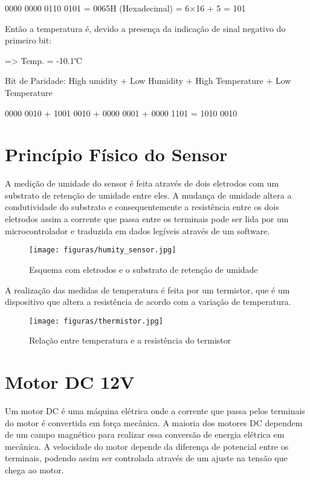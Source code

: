 0000 0000 0110 0101 = 0065H (Hexadecimal) = 6×16 + 5  = 101  

Então a temperatura é, devido a presença da indicação de sinal negativo do primeiro bit:

=> Temp. = -10.1℃ 

Bit de Paridade: High umidity + Low Humidity + High Temperature + Low Temperature

0000 0010 + 1001 0010 + 0000 0001 + 0000 1101 = 1010 0010

\section{Princípio Físico do Sensor}

A medição de umidade do sensor é feita através de dois eletrodos com um substrato de retenção de umidade entre eles. A mudança de umidade altera a condutividade do substrato e consequentemente a resistência entre os dois eletrodos assim a corrente que passa entre os terminais pode ser lida por um microcontrolador e traduzida em dados legíveis através de um software\cite{ned2017}.

\begin{figure}[H]
	\centering
	\texttt{[image: figuras/humity\_sensor.jpg]}
	\caption{Esquema com eletrodos e o substrato de retenção de umidade}
	\label{humity_sensor}
\end{figure}

A realização das medidas de temperatura é feita por um termistor, que é um dispositivo que altera a resistência de acordo com a variação de temperatura.

\begin{figure}[H]
	\centering
	\texttt{[image: figuras/thermistor.jpg]}
	\caption{Relação entre temperatura e a resistência do termistor}
	\label{thermistor}
\end{figure}

\section{Motor DC 12V}

Um motor DC é uma máquina elétrica onde a corrente que passa pelos terminais do motor é convertida em força mecânica. A maioria dos motores DC dependem de um campo magnético para realizar essa conversão de energia elétrica em mecânica. A velocidade do motor depende da diferença de potencial entre os terminais, podendo assim ser controlada  através de um ajuste na tensão que chega ao motor\cite{metmotor2015}.

